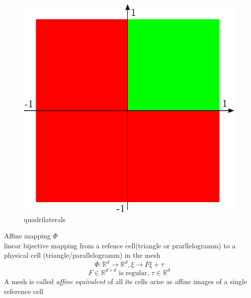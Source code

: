 \documentclass[english]{article}
\theoremstyle{definition}
\theoremstyle{remark}
\newcommand{\RR}{\mathbb{R}}			%
\newcommand{\tx}[1]{\text{#1}}
\begin{document}
\begin{figure}[H]
  \begin{center}
    \includegraphics[width=\textwidth]{figs/quadrilaterals.pdf}
  \end{center}
  \caption{quadrilaterals}
  \label{quadrilaterals-figure}
\end{figure}

Affine mapping $\Phi$\\
linear bijective mapping from a refence cell(triangle or prarllelogramm) to a physical cell (triangle/parallelogramm) in the mesh $$\Phi : \RR^d \to \RR^d , \xi \to F \xi + \tau$$
$$F \in \RR^{d\times d} \tx{ is regular, } \tau \in \RR^d$$
A mesh is called \emph{affine equivalent} of all its cells arise as affine images of a single reference cell
\end{document}
